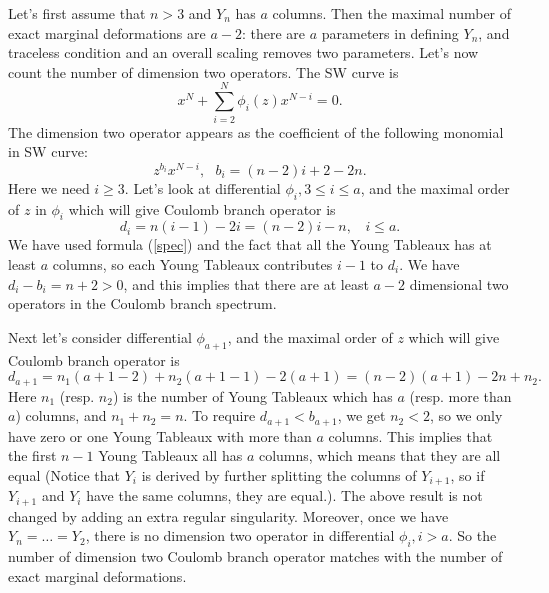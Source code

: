 \documentclass[a4paper,11pt]{article}
\begin{document}
Let's first assume that  $n>3$ and $Y_n$ has $a$ columns. Then the maximal 
number of exact marginal deformations are $a-2$: there are $a$ parameters in defining $Y_n$, and traceless condition and an overall scaling removes two parameters. 
Let's now count the number of dimension two operators. The SW curve is 
\begin{equation}
x^N+\sum_{i=2}^N \phi_i(z) x^{N-i}=0.
\end{equation}
The dimension two operator appears as the coefficient of the following monomial in SW curve:
\begin{equation}
z^{b_i}x^{N-i},~~~b_i=(n-2)i+2-2n.
\end{equation}
Here we need $i\geq 3$. Let's  look at differential $\phi_i, 3\leq i\leq  a$, and the maximal order of $z$ in $\phi_i$ which will give  Coulomb branch operator  is 
\begin{equation}
d_i=n(i-1)-2i=(n-2)i-n,~~~~i\leq a.
\end{equation} 
We have used formula (\ref{spec}) and the fact that all the Young Tableaux  has at least $a$ columns, so each Young Tableaux contributes $i-1$ to $d_i$.  We have $d_i-b_i=n+2>0$, and this  implies that there are 
at least $a-2$ dimensional two operators in the Coulomb branch spectrum.

Next let's consider differential $\phi_{a+1}$, and the maximal order of $z$ which will give Coulomb branch operator is 
\begin{equation}
d_{a+1}= n_1(a+1-2)+n_2(a+1-1)-2(a+1)=(n-2)(a+1)-2n+n_2.
\end{equation}
Here $n_1$ (resp. $n_2$) is the number of Young Tableaux which has $a$ (resp. more than $a$) columns, and $n_1+n_2=n$.    
To require $d_{a+1}<b_{a+1}$, we get $n_2<2$, so we only have zero or one Young Tableaux with more than $a$ columns. This implies that the first $n-1$ Young Tableaux 
all has $a$ columns, which means that they are all equal (Notice that $Y_i$ is derived by further splitting the columns of $Y_{i+1}$, so if $Y_{i+1}$  and $Y_i$ have the same columns, they are equal.).
The above result is not changed by adding an extra regular singularity.  Moreover, once we have $Y_n=\ldots=Y_2$, there is no dimension two operator in differential $\phi_i, i>a$. So 
the number of dimension two Coulomb branch operator matches with the number of exact marginal deformations. 
\end{document}
